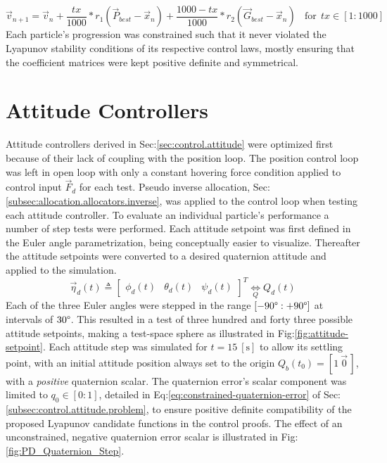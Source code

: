 \begin{equation}
\vec{v}_{n+1}=\vec{v}_n+\frac{tx}{1000}\ast r_1(\vec{P}_{best}-\vec{x}_n)+\frac{1000-tx}{1000}\ast r_2(\vec{G}_{best}-\vec{x}_n)~~~~\text{for}~~tx\in[1:1000]
\end{equation}
Each particle's progression was constrained such that it never violated the Lyapunov stability conditions of its respective control laws, mostly ensuring that the coefficient matrices were kept positive definite and symmetrical.
\section{Attitude Controllers}
\label{sec:simulation.attitude}
Attitude controllers derived in Sec:\ref{sec:control.attitude} were optimized first because of their lack of coupling with the position loop. The position control loop was left in open loop with only a constant hovering force condition applied to control input $\vec{F}_d$ for each test. Pseudo inverse allocation, Sec:\ref{subsec:allocation.allocators.inverse}, was applied to the control loop when testing each attitude controller. To evaluate an individual particle's performance a number of step tests were performed. Each attitude setpoint was first defined in the Euler angle parametrization, being conceptually easier to visualize. Thereafter the attitude setpoints were converted to a desired quaternion attitude and applied to the simulation.
\begin{equation}
\vec{\eta}_d(t)\triangleq \begin{bmatrix}
\phi_d(t)&
\theta_d(t)&
\psi_d(t)
\end{bmatrix}^T\underset{Q}{\iff}Q_d(t)
\end{equation}
Each of the three Euler angles were stepped in the range $[-90\text{\textdegree}:+90\text{\textdegree}]$ at intervals of $30\text{\textdegree}$. This resulted in a test of three hundred and forty three possible attitude setpoints, making a test-space sphere as illustrated in Fig:\ref{fig:attitude-setpoint}. Each attitude step was simulated for $t=15~[\text{s}]$ to allow its settling point, with an initial attitude position always set to the origin $Q_b(t_0)=[1~\vec{0}\hspace{2pt}]$, with a \emph{positive} quaternion scalar. The quaternion error's scalar component was limited to $q_0\in[0:1]$, detailed in Eq:\ref{eq:constrained-quaternion-error} of Sec:\ref{subsec:control.attitude.problem}, to ensure positive definite compatibility of the proposed Lyapunov candidate functions in the control proofs. The effect of an unconstrained, negative quaternion error scalar is illustrated in Fig:\ref{fig:PD_Quaternion_Step}. 
